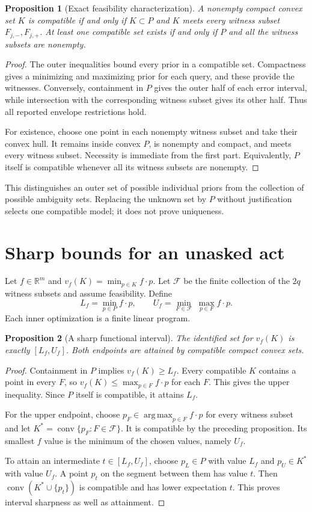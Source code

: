 \documentclass[11pt]{article}
\newtheorem{proposition}{Proposition}
\newcommand{\R}{\mathbb R}
\DeclareMathOperator*{\argmax}{arg\,max}
\begin{document}
\begin{proposition}[Exact feasibility characterization]
A nonempty compact convex set $K$ is compatible if and only if $K\subset P$ and $K$ meets every witness subset $F_{j,-},F_{j,+}$. At least one compatible set exists if and only if $P$ and all the witness subsets are nonempty.
\end{proposition}
\begin{proof}
The outer inequalities bound every prior in a compatible set. Compactness gives a minimizing and maximizing prior for each query, and these provide the witnesses. Conversely, containment in $P$ gives the outer half of each error interval, while intersection with the corresponding witness subset gives its other half. Thus all reported envelope restrictions hold.

For existence, choose one point in each nonempty witness subset and take their convex hull. It remains inside convex $P$, is nonempty and compact, and meets every witness subset. Necessity is immediate from the first part. Equivalently, $P$ itself is compatible whenever all its witness subsets are nonempty.
\end{proof}

This distinguishes an outer set of possible individual priors from the collection of possible ambiguity sets. Replacing the unknown set by $P$ without justification selects one compatible model; it does not prove uniqueness.

\section*{Sharp bounds for an unasked act}
Let $f\in\R^m$ and $v_f(K)=\min_{p\in K}f\cdot p$. Let $\mathcal F$ be the finite collection of the $2q$ witness subsets and assume feasibility. Define
\[
 L_f=\min_{p\in P}f\cdot p,
 \qquad U_f=\min_{F\in\mathcal F}\ \max_{p\in F}f\cdot p.
\]
Each inner optimization is a finite linear program.
\begin{proposition}[A sharp functional interval]
The identified set for $v_f(K)$ is exactly $[L_f,U_f]$. Both endpoints are attained by compatible compact convex sets.
\end{proposition}
\begin{proof}
Containment in $P$ implies $v_f(K)\geq L_f$. Every compatible $K$ contains a point in every $F$, so $v_f(K)\leq\max_{p\in F}f\cdot p$ for each $F$. This gives the upper inequality. Since $P$ itself is compatible, it attains $L_f$.

For the upper endpoint, choose $p_F\in\argmax_{p\in F}f\cdot p$ for every witness subset and let $K^*=\operatorname{conv}\{p_F:F\in\mathcal F\}$. It is compatible by the preceding proposition. Its smallest $f$ value is the minimum of the chosen values, namely $U_f$.

To attain an intermediate $t\in[L_f,U_f]$, choose $p_L\in P$ with value $L_f$ and $p_U\in K^*$ with value $U_f$. A point $p_t$ on the segment between them has value $t$. Then $\operatorname{conv}(K^*\cup\{p_t\})$ is compatible and has lower expectation $t$. This proves interval sharpness as well as attainment.
\end{proof}
\end{document}
